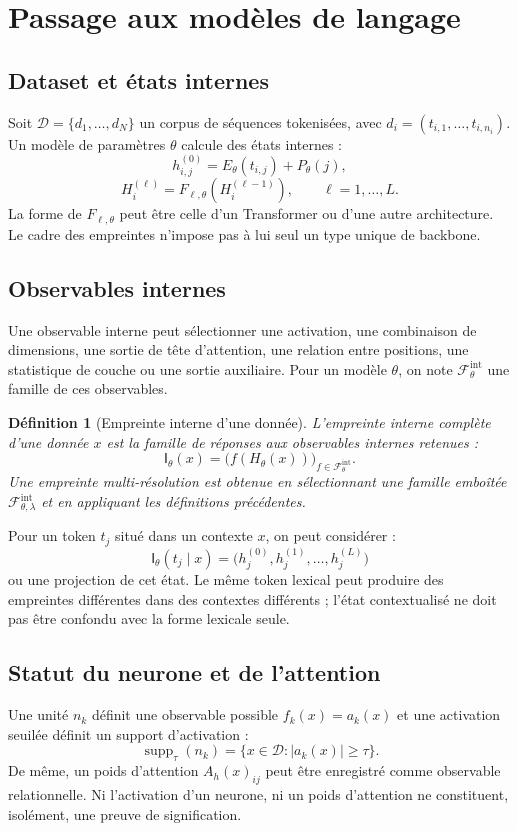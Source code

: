 \documentclass[11pt,a4paper]{article}
\newtheorem{definition}{Définition}[section]
\theoremstyle{remark}
\newcommand{\D}{\mathcal D}
\newcommand{\F}{\mathcal F}
\newcommand{\supp}{\operatorname{supp}}
\newcommand{\Emp}{\mathsf I}
\newcommand{\1}{\mathbf 1}
\begin{document}
\section{Passage aux modèles de langage}

\subsection{Dataset et états internes}
Soit $\D=\{d_1,\ldots,d_N\}$ un corpus de séquences tokenisées, avec $d_i=(t_{i,1},\ldots,t_{i,n_i})$. Un modèle de paramètres $\theta$ calcule des états internes :
\[
h_{i,j}^{(0)}=E_\theta(t_{i,j})+P_\theta(j),
\]
\[
H_i^{(\ell)}=F_{\ell,\theta}(H_i^{(\ell-1)}),\qquad \ell=1,\ldots,L.
\]
La forme de $F_{\ell,\theta}$ peut être celle d'un Transformer ou d'une autre architecture. Le cadre des empreintes n'impose pas à lui seul un type unique de backbone.

\subsection{Observables internes}
Une observable interne peut sélectionner une activation, une combinaison de dimensions, une sortie de tête d'attention, une relation entre positions, une statistique de couche ou une sortie auxiliaire. Pour un modèle $\theta$, on note $\F_\theta^{\mathrm{int}}$ une famille de ces observables.

\begin{definition}[Empreinte interne d'une donnée]
L'empreinte interne complète d'une donnée $x$ est la famille de réponses aux observables internes retenues :
\[
\Emp_\theta(x)=\bigl(f(H_\theta(x))\bigr)_{f\in\F_\theta^{\mathrm{int}}}.
\]
Une empreinte multi-résolution est obtenue en sélectionnant une famille emboîtée $\F_{\theta,\lambda}^{\mathrm{int}}$ et en appliquant les définitions précédentes.
\end{definition}

Pour un token $t_j$ situé dans un contexte $x$, on peut considérer :
\[
\Emp_\theta(t_j\mid x)=\bigl(h_j^{(0)},h_j^{(1)},\ldots,h_j^{(L)}\bigr)
\]
ou une projection de cet état. Le même token lexical peut produire des empreintes différentes dans des contextes différents ; l'état contextualisé ne doit pas être confondu avec la forme lexicale seule.

\subsection{Statut du neurone et de l'attention}
Une unité $n_k$ définit une observable possible $f_k(x)=a_k(x)$ et une activation seuilée définit un support d'activation :
\[
\supp_\tau(n_k)=\{x\in\D:|a_k(x)|\geq\tau\}.
\]
De même, un poids d'attention $A_h(x)_{ij}$ peut être enregistré comme observable relationnelle. Ni l'activation d'un neurone, ni un poids d'attention ne constituent, isolément, une preuve de signification.
\end{document}
